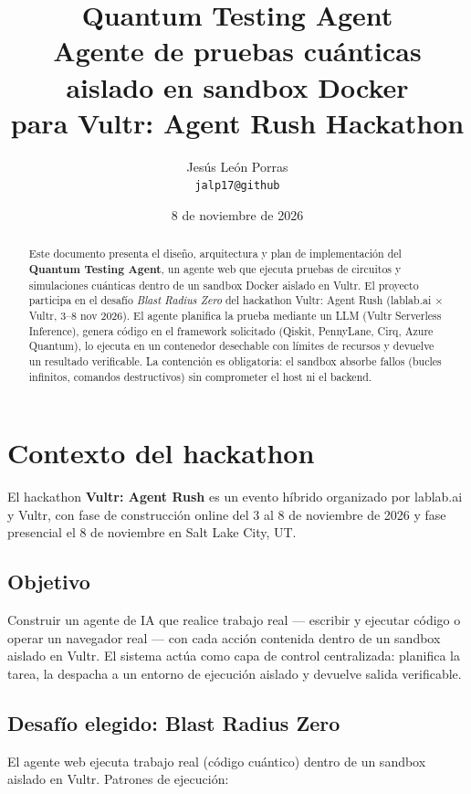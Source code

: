 \documentclass[11pt,a4paper]{article}
\title{\textbf{Quantum Testing Agent}\\
\large Agente de pruebas cuánticas aislado en sandbox Docker\\
\large para Vultr: Agent Rush Hackathon}
\author{Jesús León Porras\\
\texttt{jalp17@github}}
\date{8 de noviembre de 2026}
\begin{document}
\maketitle

\begin{abstract}
Este documento presenta el diseño, arquitectura y plan de implementación del
\textbf{Quantum Testing Agent}, un agente web que ejecuta pruebas de circuitos y
simulaciones cuánticas dentro de un sandbox Docker aislado en Vultr. El proyecto
participa en el desafío \textit{Blast Radius Zero} del hackathon Vultr: Agent Rush
(lablab.ai $\times$ Vultr, 3--8 nov 2026). El agente planifica la prueba mediante
un LLM (Vultr Serverless Inference), genera código en el framework solicitado
(Qiskit, PennyLane, Cirq, Azure Quantum), lo ejecuta en un contenedor desechable
con límites de recursos y devuelve un resultado verificable. La contención es
obligatoria: el sandbox absorbe fallos (bucles infinitos, comandos destructivos)
sin comprometer el host ni el backend.
\end{abstract}

\tableofcontents
\newpage

\section{Contexto del hackathon}

El hackathon \textbf{Vultr: Agent Rush} es un evento híbrido organizado por
lablab.ai y Vultr, con fase de construcción online del 3 al 8 de noviembre de
2026 y fase presencial el 8 de noviembre en Salt Lake City, UT.

\subsection{Objetivo}

Construir un agente de IA que realice trabajo real --- escribir y ejecutar código
o operar un navegador real --- con cada acción contenida dentro de un sandbox
aislado en Vultr. El sistema actúa como capa de control centralizada: planifica
la tarea, la despacha a un entorno de ejecución aislado y devuelve salida
verificable.

\subsection{Desafío elegido: Blast Radius Zero}

El agente web ejecuta trabajo real (código cuántico) dentro de un sandbox aislado
en Vultr. Patrones de ejecución:
\end{document}
